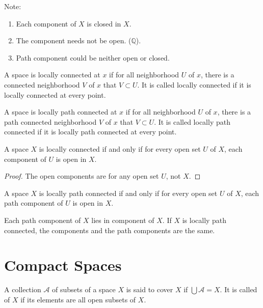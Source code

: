 Note: 
\begin{enumerate}
    \item Each component of $X$ is closed in $X$.
    \item The component needs not be open. ($\mathbb{Q}$).
    \item Path component could be neither open or closed.
\end{enumerate}

\begin{definition}
    A space is locally connected at $x$ if for all neighborhood $U$ of $x$, there is a connected neighborhood $V$ of $x$ that $V \subset U$. It is called locally connected if it is locally connected at every point.
\end{definition}

\begin{definition}
    A space is locally path connected at $x$ if for all neighborhood $U$ of $x$, there is a path connected neighborhood $V$ of $x$ that $V \subset U$. It is called locally path connected if it is locally path connected at every point.
\end{definition}

\begin{theorem}
A space $X$ is locally connected if and only if for every open set $U$ of $X$, each component of $U$ is open in $X$.    
\end{theorem}
\begin{proof}
    The open components are for any open set $U$, not $X$.
\end{proof}

\begin{theorem}
A space $X$ is locally path connected if and only if for every open set $U$ of $X$, each path component of $U$ is open in $X$.    
\end{theorem}

\begin{theorem}
Each path component of $X$ lies in component of $X$. If $X$ is locally path connected, the components and the path components are the same.    
\end{theorem}



\section{Compact Spaces}

\begin{definition}
    A collection $\mathcal{A}$ of subsets of a space $X$ is said to cover $X$ if $\bigcup \mathcal{A} = X$. It is called  of $X$ if its elements are all open subsets of $X$.
\end{definition}

